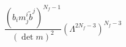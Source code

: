 \begin{equation}
  \frac{(b_i m^i_{j} \tilde{b}^{{j}})^{N_f-1}}
  {(\det m)^2} (\Lambda^{2N_f-3})^{N_f-3}
\end{equation}

